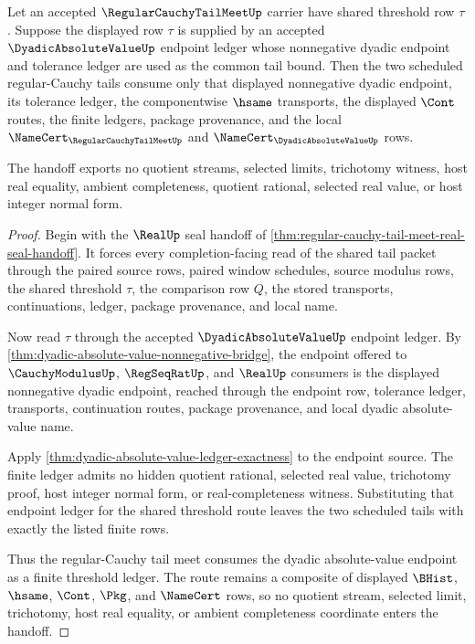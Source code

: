 \begin{theorem}
\label{thm:regular-cauchy-tail-meet-dyadic-absolute-value-handoff}
Let an accepted $\RegularCauchyTailMeetUp$ carrier have shared threshold row $\tau$. Suppose the displayed row $\tau$ is supplied by an accepted $\DyadicAbsoluteValueUp$ endpoint ledger whose nonnegative dyadic endpoint and tolerance ledger are used as the common tail bound. Then the two scheduled regular-Cauchy tails consume only that displayed nonnegative dyadic endpoint, its tolerance ledger, the componentwise $\hsame$ transports, the displayed $\Cont$ routes, the finite ledgers, package provenance, and the local $\NameCert_{\RegularCauchyTailMeetUp}$ and $\NameCert_{\DyadicAbsoluteValueUp}$ rows.

The handoff exports no quotient streams, selected limits, trichotomy witness, host real equality, ambient completeness, quotient rational, selected real value, or host integer normal form.
\end{theorem}
\begin{proof}
Begin with the $\RealUp$ seal handoff of \autoref{thm:regular-cauchy-tail-meet-real-seal-handoff}. It forces every completion-facing read of the shared tail packet through the paired source rows, paired window schedules, source modulus rows, the shared threshold $\tau$, the comparison row $Q$, the stored transports, continuations, ledger, package provenance, and local name.

Now read $\tau$ through the accepted $\DyadicAbsoluteValueUp$ endpoint ledger. By \autoref{thm:dyadic-absolute-value-nonnegative-bridge}, the endpoint offered to $\CauchyModulusUp$, $\RegSeqRatUp$, and $\RealUp$ consumers is the displayed nonnegative dyadic endpoint, reached through the endpoint row, tolerance ledger, transports, continuation routes, package provenance, and local dyadic absolute-value name.

Apply \autoref{thm:dyadic-absolute-value-ledger-exactness} to the endpoint source. The finite ledger admits no hidden quotient rational, selected real value, trichotomy proof, host integer normal form, or real-completeness witness. Substituting that endpoint ledger for the shared threshold route leaves the two scheduled tails with exactly the listed finite rows.

Thus the regular-Cauchy tail meet consumes the dyadic absolute-value endpoint as a finite threshold ledger. The route remains a composite of displayed $\BHist$, $\hsame$, $\Cont$, $\Pkg$, and $\NameCert$ rows, so no quotient stream, selected limit, trichotomy, host real equality, or ambient completeness coordinate enters the handoff.
\end{proof}

